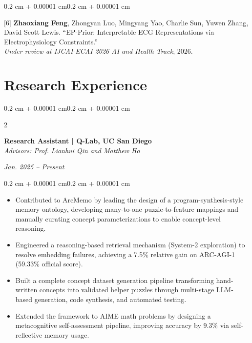 \documentclass[10pt, letterpaper]{article}
\newenvironment{highlights}{
    \begin{itemize}[
        topsep=0.10 cm,
        parsep=0.10 cm,
        partopsep=0pt,
        itemsep=0pt,
        leftmargin=0.4 cm + 10pt
    ]
}{\end{itemize}}
\newenvironment{onecolentry}{
    \begin{adjustwidth}{0.2 cm + 0.00001 cm}{0.2 cm + 0.00001 cm}
}{\end{adjustwidth}}
\newenvironment{twocolentry}[2][]{
    \onecolentry
    \def\secondColumn{#2}
    \setcolumnwidth{\fill, 4.5 cm}
    \begin{paracol}{2}
}{
    \switchcolumn \raggedleft \secondColumn
    \end{paracol}
    \endonecolentry
}
\begin{document}
    \vspace{0.20 cm}

    \begin{onecolentry}
        [6] \textbf{Zhaoxiang Feng}, Zhongyan Luo, Mingyang Yao, Charlie Sun, Yuwen Zhang, David Scott Lewis. ``EP-Prior: Interpretable ECG Representations via Electrophysiology Constraints.''\\
        \textit{Under review at IJCAI-ECAI 2026 AI and Health Track}, 2026.
    \end{onecolentry}

    \section{Research Experience}

    \begin{twocolentry}{\textit{Jan. 2025 -- Present}}
        \textbf{Research Assistant | Q-Lab, UC San Diego}\\
        \textit{Advisors: Prof. Lianhui Qin and Matthew Ho}
    \end{twocolentry}
    \vspace{0.10 cm}
    \begin{onecolentry}
        \begin{highlights}
            \item Contributed to ArcMemo by leading the design of a program-synthesis-style memory ontology, developing many-to-one puzzle-to-feature mappings and manually curating concept parameterizations to enable concept-level reasoning.
            \item Engineered a reasoning-based retrieval mechanism (System-2 exploration) to resolve embedding failures, achieving a 7.5\% relative gain on ARC-AGI-1 (59.33\% official score).
            \item Built a complete concept dataset generation pipeline transforming hand-written concepts into validated helper puzzles through multi-stage LLM-based generation, code synthesis, and automated testing.
            \item Extended the framework to AIME math problems by designing a metacognitive self-assessment pipeline, improving accuracy by 9.3\% via self-reflective memory usage.
        \end{highlights}
    \end{onecolentry}
    \vspace{0.20 cm}
\end{document}
